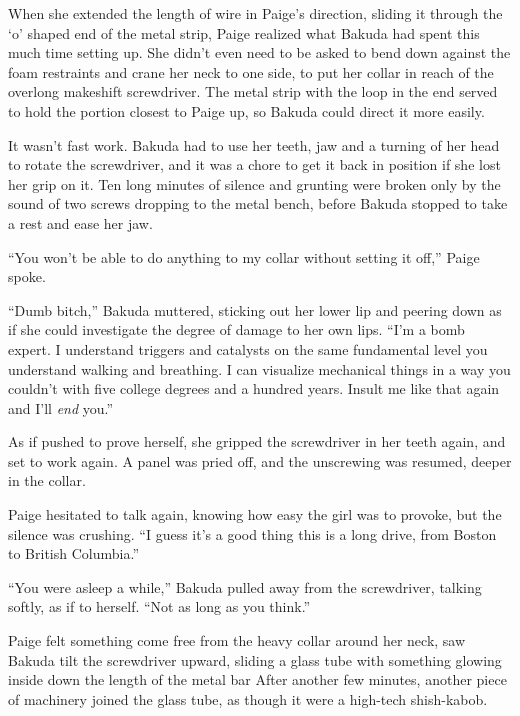 When she extended the length of wire in Paige's direction, sliding it through the `o' shaped end of the metal strip, Paige realized what Bakuda had spent this much time setting up.  She didn't even need to be asked to bend down against the foam restraints and crane her neck to one side, to put her collar in reach of the overlong makeshift screwdriver.   The metal strip with the loop in the end served to hold the portion closest to Paige up, so Bakuda could direct it more easily.



It wasn't fast work.  Bakuda had to use her teeth, jaw and a turning of her head to rotate the screwdriver, and it was a chore to get it back in position if she lost her grip on it.  Ten long minutes of silence and grunting were broken only by the sound of two screws dropping to the metal bench, before Bakuda stopped to take a rest and ease her jaw.



``You won't be able to do anything to my collar without setting it off,'' Paige spoke.



``Dumb bitch,'' Bakuda muttered, sticking out her lower lip and peering down as if she could investigate the degree of damage to her own lips.  ``I'm a bomb expert.  I understand triggers and catalysts on the same fundamental level you understand walking and breathing.  I can visualize mechanical things in a way you couldn't with five college degrees and a hundred years.  Insult me like that again and I'll \emph{end} you.''



As if pushed to prove herself, she gripped the screwdriver in her teeth again, and set to work again.  A panel was pried off, and the unscrewing was resumed, deeper in the collar.



Paige hesitated to talk again, knowing how easy the girl was to provoke, but the silence was crushing.  ``I guess it's a good thing this is a long drive, from Boston to British Columbia.''



``You were asleep a while,'' Bakuda pulled away from the screwdriver, talking softly, as if to herself.  ``Not as long as you think.''



Paige felt something come free from the heavy collar around her neck, saw Bakuda tilt the screwdriver upward, sliding a glass tube with something glowing inside down the length of the metal bar  After another few minutes, another piece of machinery joined the glass tube, as though it were a high-tech shish-kabob.



